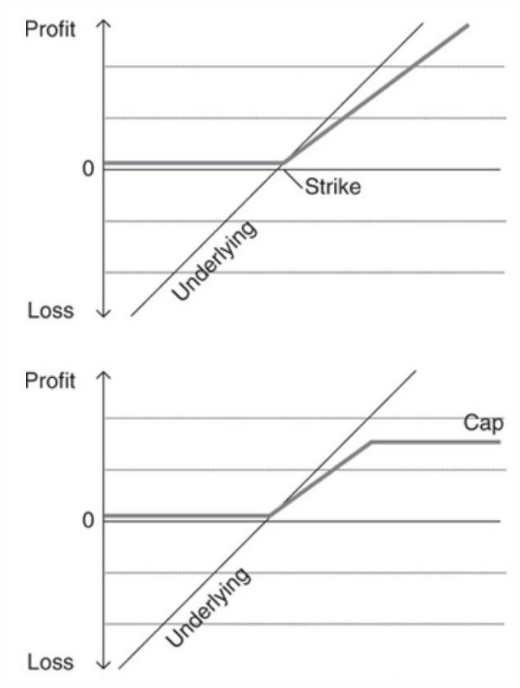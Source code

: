 \documentclass[11pt]{article}
\begin{document}
\begin{center}
\includegraphics[max width=\textwidth]{2024_04_10_b75ef470ae043c0f718dg-2(1)}
\end{center}
\end{document}
